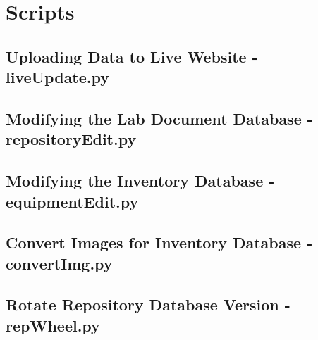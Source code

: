 \documentclass[justified]{LabArx1_5}
\begin{document}
\section{Scripts}

\subsection{Uploading Data to Live Website - liveUpdate.py}



\clearpage
\subsection{Modifying the Lab Document Database - repositoryEdit.py}



\clearpage
\subsection{Modifying the Inventory Database - equipmentEdit.py}



\subsection{Convert Images for Inventory Database - convertImg.py}




\subsection{Rotate Repository Database Version - repWheel.py}


\end{document}
